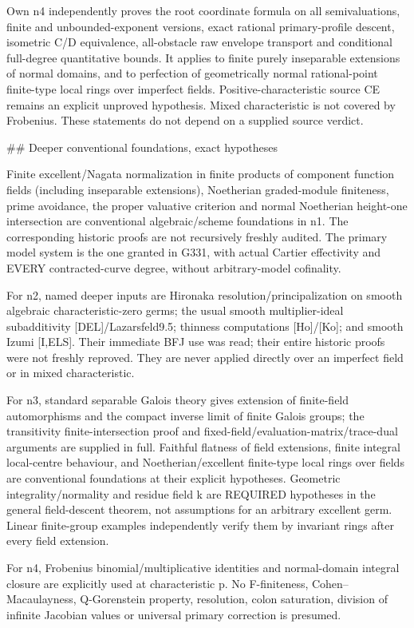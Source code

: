 \documentclass[11pt]{article}
\begin{document}
Own n4 independently proves the root coordinate formula on all semivaluations, finite and unbounded-exponent versions, exact rational primary-profile descent, isometric C/D equivalence, all-obstacle raw envelope transport and conditional full-degree quantitative bounds. It applies to finite purely inseparable extensions of normal domains, and to perfection of geometrically normal rational-point finite-type local rings over imperfect fields. Positive-characteristic source CE remains an explicit unproved hypothesis. Mixed characteristic is not covered by Frobenius. These statements do not depend on a supplied source verdict.

\#\# Deeper conventional foundations, exact hypotheses

Finite excellent/Nagata normalization in finite products of component function fields (including inseparable extensions), Noetherian graded-module finiteness, prime avoidance, the proper valuative criterion and normal Noetherian height-one intersection are conventional algebraic/scheme foundations in n1. The corresponding historic proofs are not recursively freshly audited. The primary model system is the one granted in G331, with actual Cartier effectivity and EVERY contracted-curve degree, without arbitrary-model cofinality.

For n2, named deeper inputs are Hironaka resolution/principalization on smooth algebraic characteristic-zero germs; the usual smooth multiplier-ideal subadditivity [DEL]/Lazarsfeld9.5; thinness computations [Ho]/[Ko]; and smooth Izumi [I,ELS]. Their immediate BFJ use was read; their entire historic proofs were not freshly reproved. They are never applied directly over an imperfect field or in mixed characteristic.

For n3, standard separable Galois theory gives extension of finite-field automorphisms and the compact inverse limit of finite Galois groups; the transitivity finite-intersection proof and fixed-field/evaluation-matrix/trace-dual arguments are supplied in full. Faithful flatness of field extensions, finite integral local-centre behaviour, and Noetherian/excellent finite-type local rings over fields are conventional foundations at their explicit hypotheses. Geometric integrality/normality and residue field k are REQUIRED hypotheses in the general field-descent theorem, not assumptions for an arbitrary excellent germ. Linear finite-group examples independently verify them by invariant rings after every field extension.

For n4, Frobenius binomial/multiplicative identities and normal-domain integral closure are explicitly used at characteristic p. No F-finiteness, Cohen--Macaulayness, Q-Gorenstein property, resolution, colon saturation, division of infinite Jacobian values or universal primary correction is presumed.
\end{document}
